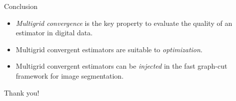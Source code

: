 \begin{frame}
	{Conclusion}
	
	\begin{itemize}
		\item<1->{\emph{Multigrid convergence} is the key property to evaluate the quality of an estimator in digital data.}
		\item<2->{Multigrid convergent estimators are suitable to \emph{optimization}.}		
		\item<3->{Multigrid convergent estimators can be \emph{injected} in the fast graph-cut framework for image segmentation.}				
	\end{itemize}

	
\end{frame}

\begin{frame}
\center
\huge Thank you!
\end{frame}